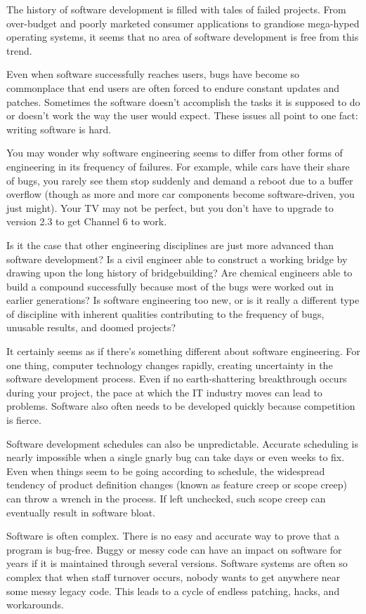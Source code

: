 The history of software development is filled with tales of failed projects. From over-budget and poorly marketed consumer applications to grandiose mega-hyped operating systems, it seems that no area of software development is free from this trend.

Even when software successfully reaches users, bugs have become so commonplace that end users are often forced to endure constant updates and patches. Sometimes the software doesn’t accomplish the tasks it is supposed to do or doesn’t work the way the user would expect. These issues all point to one fact: writing software is hard.

You may wonder why software engineering seems to differ from other forms of engineering in its frequency of failures. For example, while cars have their share of bugs, you rarely see them stop suddenly and demand a reboot due to a buffer overflow (though as more and more car components become software-driven, you just might). Your TV may not be perfect, but you don’t have to upgrade to version 2.3 to get Channel 6 to work.

Is it the case that other engineering disciplines are just more advanced than software development? Is a civil engineer able to construct a working bridge by drawing upon the long history of bridgebuilding? Are chemical engineers able to build a compound successfully because most of the bugs were worked out in earlier generations? Is software engineering too new, or is it really a different type of discipline with inherent qualities contributing to the frequency of bugs, unusable results, and doomed projects?

It certainly seems as if there’s something different about software engineering. For one thing, computer technology changes rapidly, creating uncertainty in the software development process. Even if no earth-shattering breakthrough occurs during your project, the pace at which the IT industry moves can lead to problems. Software also often needs to be developed quickly because competition is fierce.

Software development schedules can also be unpredictable. Accurate scheduling is nearly impossible when a single gnarly bug can take days or even weeks to fix. Even when things seem to be going according to schedule, the widespread tendency of product definition changes (known as feature creep or scope creep) can throw a wrench in the process. If left unchecked, such scope creep can eventually result in software bloat.

Software is often complex. There is no easy and accurate way to prove that a program is bug-free. Buggy or messy code can have an impact on software for years if it is maintained through several versions. Software systems are often so complex that when staff turnover occurs, nobody wants to get anywhere near some messy legacy code. This leads to a cycle of endless patching, hacks, and workarounds.

